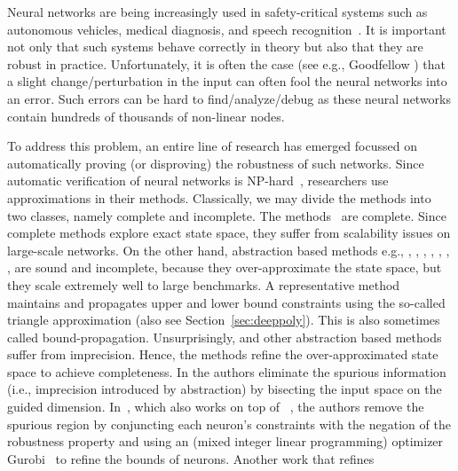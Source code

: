 Neural networks are being increasingly used in safety-critical systems such as autonomous vehicles, medical diagnosis, and speech recognition~\cite{bojarski2016end,amato2013artificial,hinton2012deep}. It is important not only that such systems behave correctly in theory but also that they are robust in practice. Unfortunately, it is often the case (see e.g., Goodfellow \cite{goodfellow2014explaining}) that a slight change/perturbation in the input can often fool the neural networks into an error. Such errors can be hard to find/analyze/debug as these neural networks contain hundreds of thousands of non-linear nodes.

To address this problem, an entire line of research has emerged focussed on automatically proving (or disproving) the robustness of such networks. Since automatic verification of neural networks is NP-hard~\cite{katz2021reluplex}, researchers use approximations in their methods. Classically, we may divide the methods into two classes, namely complete and incomplete. The methods~\cite{lomuscio2017approach,fischetti2018deep,dutta2018output,cheng2017maximum,katz2017reluplex,katz2019marabou,ehlers2017formal,huang2017safety,wang2021beta,xu2020fast,zhang2022general} are complete. Since complete methods explore exact state space, they suffer from scalability issues on large-scale networks. On the other hand, abstraction based methods e.g., \cite{dvijotham2018dual}, \cite{gehr2018ai2}, \cite{singh2018fast},  \cite{singh2018boosting}, \cite{weng2018towards}, \cite{wong2018provable}, \cite{zhang2018efficient}, \cite{zhang2018efficient} are sound and incomplete, because they over-approximate the state space, but they scale extremely well to large benchmarks. A representative method \deeppoly{}~\cite{singh2019abstract} maintains and propagates upper and lower bound constraints using the so-called triangle approximation (also see Section~\ref{sec:deeppoly}). This is also sometimes called bound-propagation. %
Unsurprisingly, \deeppoly{} and other abstraction based methods suffer from imprecision. Hence, the methods \cite{wang2018formal,wang2018efficient,elboher2020abstraction,yang2021improving,lin2020art} refine the over-approximated state space to achieve completeness. In \cite{wang2018formal,wang2018efficient,lin2020art} the authors eliminate the spurious information (i.e., imprecision introduced by abstraction) by bisecting the input space on the guided dimension. In~\cite{yang2021improving}, which also works on top of \deeppoly{}~\cite{singh2019abstract}, the authors remove the spurious region by  conjuncting each neuron's constraints with the negation of the robustness property and using an \milp{} (mixed integer linear programming) optimizer Gurobi~\cite{gurobioptimizer} to refine the bounds of neurons. Another work that refines
